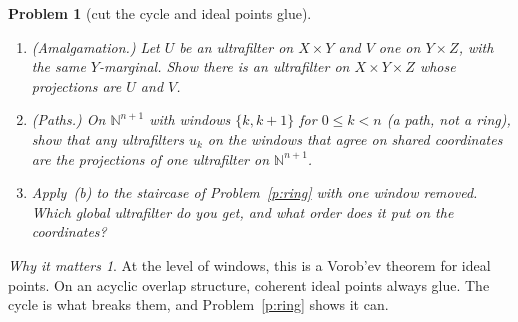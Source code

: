 \documentclass[11pt]{article}
\newtheorem{problem}{Problem}
\theoremstyle{definition}
\theoremstyle{remark}
\newtheorem*{why}{Why it matters}
\newcommand{\bbN}{\mathbb{N}}
\begin{document}
\begin{problem}[cut the cycle and ideal points glue]\label{p:amalg}
\begin{enumerate}[label=(\alph*)]
  \item (\emph{Amalgamation.}) Let $U$ be an ultrafilter on $X\times Y$ and $V$
    one on $Y\times Z$, with the same $Y$-marginal. Show there is an ultrafilter
    on $X\times Y\times Z$ whose projections are $U$ and $V$.
  \item (\emph{Paths.}) On $\bbN^{n+1}$ with windows $\{k,k{+}1\}$ for
    $0\le k<n$ (a path, not a ring), show that any ultrafilters $u_k$ on the
    windows that agree on shared coordinates are the projections of one
    ultrafilter on $\bbN^{n+1}$.
  \item Apply~(b) to the staircase of Problem~\ref{p:ring} with one window
    removed. Which global ultrafilter do you get, and what order does it put on
    the coordinates?
\end{enumerate}
\end{problem}
\begin{why}
At the level of windows, this is a Vorob'ev theorem for ideal points. On an
acyclic overlap structure, coherent ideal points always glue. The cycle is what
breaks them, and Problem~\ref{p:ring} shows it can.
\end{why}
\end{document}
